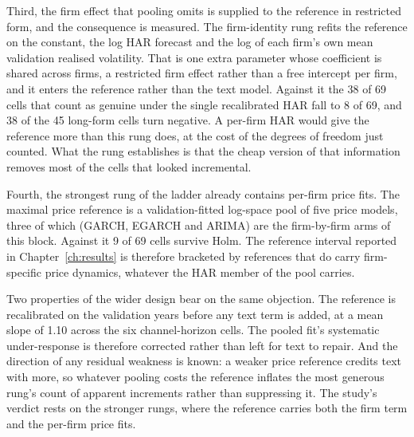 Third, the firm effect that pooling omits is supplied to the reference in
restricted form, and the consequence is measured. The firm-identity rung refits
the reference on the constant, the log HAR forecast and the log of each firm's own
mean validation realised volatility. That is one extra parameter whose coefficient
is shared across firms, a restricted firm effect rather than a free intercept per
firm, and it enters the reference rather than the text model. Against it the 38 of
69 cells that count as genuine under the single recalibrated HAR fall to 8 of 69,
and 38 of the 45 long-form cells turn negative. %
A per-firm HAR would give the reference more than this rung does, at the cost of
the degrees of freedom just counted. What the rung establishes is that the cheap
version of that information removes most of the cells that looked incremental.

Fourth, the strongest rung of the ladder already contains per-firm price fits. The
maximal price reference is a validation-fitted log-space pool of five price
models, three of which (GARCH, EGARCH and ARIMA) are the firm-by-firm arms of this
block. Against it 9 of 69 cells survive Holm. %
The reference interval reported in Chapter~\ref{ch:results} is therefore bracketed
by references that do carry firm-specific price dynamics, whatever the HAR member
of the pool carries.

Two properties of the wider design bear on the same objection. The reference is
recalibrated on the validation years before any text term is added, at a mean
slope of 1.10 across the six channel-horizon cells. %
The pooled fit's systematic under-response is therefore corrected rather than
left for text to repair.
And the direction of any residual weakness is known: a weaker price reference
credits text with more, so whatever pooling costs the reference inflates the most
generous rung's count of apparent increments rather than suppressing it. The
study's verdict rests on the stronger rungs, where the reference carries both the
firm term and the per-firm price fits.

